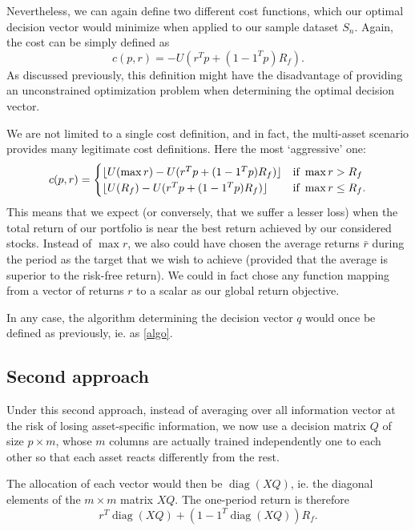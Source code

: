 \documentclass[11pt]{article}
\DeclareMathOperator{\diag}{diag}
\DeclarePairedDelimiter\floor{\lfloor}{\rfloor}
\theoremstyle{plain}
\theoremstyle{definition}
\begin{document}
Nevertheless, we can again define two different cost functions, which our optimal decision
vector would minimize when applied to our sample dataset $S_n$. Again, the cost can be
simply defined as
\begin{equation}
  c(p,r) = -U(r^{T}p + (1 - 1^{T}p)R_f).
\end{equation}
As discussed previously, this definition might have the disadvantage of providing an
unconstrained optimization problem when determining the optimal decision vector.

We are not limited to a single cost definition, and in fact, the multi-asset scenario
provides many legitimate cost definitions. Here the most `aggressive' one:
\begin{equation}
  c(p,r) =
  \begin{cases}
    \floor{U(\max r) - U(r^{T}p + (1-1^{T}p)R_f)} & \text{if } \max r>R_f\\
    \floor{U(R_f) - U(r^{T}p + (1-1^{T}p)R_f)} &\text{if } \max r\leq R_f.
  \end{cases}  
\end{equation}
This means that we expect (or conversely, that we suffer a lesser loss) when the total
return of our portfolio is near the best return achieved by our considered stocks. Instead
of $\max r$, we also could have chosen the average returns $\bar r$ during the period as
the target that we wish to achieve (provided that the average is superior to the risk-free
return). We could in fact chose any function mapping from a vector of returns $r$ to a
scalar as our global return objective.

In any case, the algorithm determining the decision vector $q$ would once be defined as
previously, ie. as \eqref{algo}.


\subsection{Second approach}

Under this second approach, instead of averaging over all information vector at the risk
of losing asset-specific information, we now use a decision matrix $Q$ of size $p\times
m$, whose $m$ columns are actually trained independently one to each other so that each
asset reacts differently from the rest. 

The allocation of each vector would then be $\diag(XQ)$, ie. the diagonal elements of the
$m\times{}m$ matrix $XQ$. The one-period return is therefore
\begin{equation}
  r^{T}\diag(XQ) + (1 - 1^{T}\diag(XQ))R_f.
\end{equation}
\end{document}
